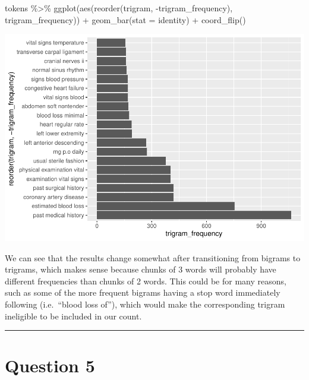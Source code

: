 \documentclass[
]{article}
\newenvironment{Shaded}{\begin{snugshade}}{\end{snugshade}}
\newcommand{\AttributeTok}[1]{\textcolor[rgb]{0.77,0.63,0.00}{#1}}
\newcommand{\FunctionTok}[1]{\textcolor[rgb]{0.00,0.00,0.00}{#1}}
\newcommand{\NormalTok}[1]{#1}
\newcommand{\SpecialCharTok}[1]{\textcolor[rgb]{0.00,0.00,0.00}{#1}}
\newcommand{\StringTok}[1]{\textcolor[rgb]{0.31,0.60,0.02}{#1}}
\begin{document}
\begin{Shaded}
\begin{Highlighting}[]
\NormalTok{tokens }\SpecialCharTok{\%\textgreater{}\%}
  \FunctionTok{ggplot}\NormalTok{(}\FunctionTok{aes}\NormalTok{(}\FunctionTok{reorder}\NormalTok{(trigram, }\SpecialCharTok{{-}}\NormalTok{trigram\_frequency), trigram\_frequency)) }\SpecialCharTok{+}
  \FunctionTok{geom\_bar}\NormalTok{(}\AttributeTok{stat =} \StringTok{\textquotesingle{}identity\textquotesingle{}}\NormalTok{) }\SpecialCharTok{+}
  \FunctionTok{coord\_flip}\NormalTok{()}
\end{Highlighting}
\end{Shaded}

\includegraphics{lab08-text-mining_files/figure-latex/unnamed-chunk-13-1.pdf}

We can see that the results change somewhat after transitioning from
bigrams to trigrams, which makes sense because chunks of 3 words will
probably have different frequencies than chunks of 2 words. This could
be for many reasons, such as some of the more frequent bigrams having a
stop word immediately following (i.e.~``blood loss of''), which would
make the corresponding trigram ineligible to be included in our count.

\begin{center}\rule{0.5\linewidth}{0.5pt}\end{center}

\hypertarget{question-5}{%
\section{Question 5}\label{question-5}}
\end{document}
